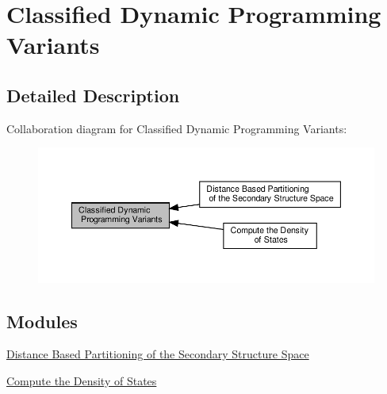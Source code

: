\hypertarget{group__class__fold}{}\section{Classified Dynamic Programming Variants}
\label{group__class__fold}


\subsection{Detailed Description}
Collaboration diagram for Classified Dynamic Programming Variants\+:
\nopagebreak
\begin{figure}[H]
\begin{center}
\leavevmode
\includegraphics[width=350pt]{group__class__fold}
\end{center}
\end{figure}
\subsection*{Modules}
\begin{DoxyCompactItemize}
\item 
\hyperlink{group__kl__neighborhood}{Distance Based Partitioning of the Secondary Structure Space}
\item 
\hyperlink{group__dos}{Compute the Density of States}
\end{DoxyCompactItemize}
